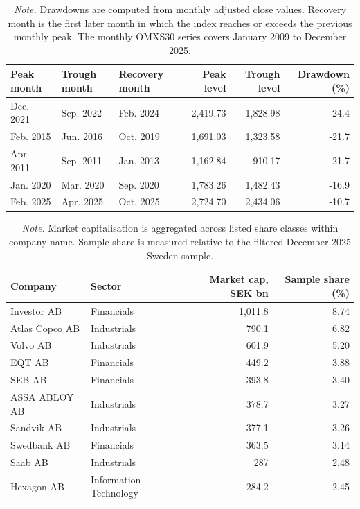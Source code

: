 \documentclass[11pt]{article}
\newcommand{\tablenote}[1]{\caption*{\footnotesize \textit{Note.} #1}}
\begin{document}
\begin{table}[H]
\centering
\caption{Largest OMXS30 Drawdowns in the Monthly OMXS30 Series}
\label{tabomxs30drawdowns}
\small
\begin{tabular}{lllrrr}
\toprule
Peak month & Trough month & Recovery month & Peak level & Trough level & Drawdown (\%) \\
\midrule
Dec. 2021 & Sep. 2022 & Feb. 2024 & 2,419.73 & 1,828.98 & -24.4 \\
Feb. 2015 & Jun. 2016 & Oct. 2019 & 1,691.03 & 1,323.58 & -21.7 \\
Apr. 2011 & Sep. 2011 & Jan. 2013 & 1,162.84 & 910.17 & -21.7 \\
Jan. 2020 & Mar. 2020 & Sep. 2020 & 1,783.26 & 1,482.43 & -16.9 \\
Feb. 2025 & Apr. 2025 & Oct. 2025 & 2,724.70 & 2,434.06 & -10.7 \\
\bottomrule
\end{tabular}
\tablenote{Drawdowns are computed from monthly adjusted close values. Recovery month is the first later month in which the index reaches or exceeds the previous monthly peak. The monthly OMXS30 series covers January 2009 to December 2025.}
\end{table}


\begin{table}[H]
\centering
\caption{Largest Companies in the Filtered Sweden Sample, December 2025}
\label{tabtopcompanies2025}
\small
\begin{tabularx}{0.92\textwidth}{Xlrr}
\toprule
Company & Sector & Market cap, SEK bn & Sample share (\%) \\
\midrule
Investor AB & Financials & 1,011.8 & 8.74 \\
Atlas Copco AB & Industrials & 790.1 & 6.82 \\
Volvo AB & Industrials & 601.9 & 5.20 \\
EQT AB & Financials & 449.2 & 3.88 \\
SEB AB & Financials & 393.8 & 3.40 \\
ASSA ABLOY AB & Industrials & 378.7 & 3.27 \\
Sandvik AB & Industrials & 377.1 & 3.26 \\
Swedbank AB & Financials & 363.5 & 3.14 \\
Saab AB & Industrials & 287& 2.48 \\
Hexagon AB & Information Technology & 284.2 & 2.45 \\
\bottomrule
\end{tabularx}
\tablenote{Market capitalisation is aggregated across listed share classes within company name. Sample share is measured relative to the filtered December 2025 Sweden sample.}
\end{table}
\end{document}
